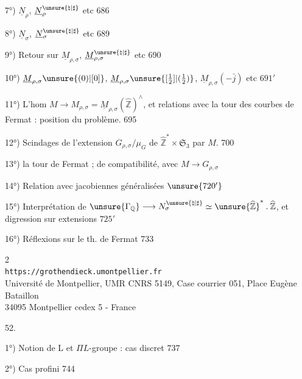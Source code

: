 7°) $\underline N_\rho$, $\underline N_\rho^{\unsure{\natural|\sharp}}$ etc \hfill 686

8°) $\underline N_\sigma$, $\underline N_\sigma^{\unsure{\natural|\sharp}}$ etc \hfill 689

9°) Retour sur $\underline M_{\rho,\sigma}$, $\underline M_{\rho,\sigma}^{\unsure{\natural|\sharp}}$ etc \hfill 690

10°) $\underline M_{\rho,\sigma}\unsure{(0)|[0]}$, $\underline M_{\rho,\sigma}\unsure{[\tfrac12]|(\tfrac12)}$, $\underline M_{\rho,\sigma}(-\bar j)$ etc \hfill $691'$

11°) L'hom $M\longrightarrow M_{\rho,\sigma}=\underline M_{\rho,\sigma}(\widehat{\mathbb Z})^{\wedge}$, et relations avec la tour des courbes de Fermat : position du problème. \hfill 695

12°) Scindages de l'extension $G_{\rho,\sigma}/\mu_G$ de $\widehat{\mathbb Z}^{*}\times\mathfrak S_3$ par $\widehat M$. \hfill 700

13°)  la tour de Fermat ;   de compatibilité, avec $M\longrightarrow G_{\rho,\sigma}$ \hfill {}

14°) Relation avec jacobiennes généralisées \hfill $\unsure{720'}$

15°) Interprétation de $\unsure{\Gamma_{\mathbb Q}}\longrightarrow N_\sigma^{\unsure{\natural|\sharp}}\simeq\unsure{\widehat{\mathbb Z}}^{*}\mathbin{.}\widehat{\mathbb Z}$, et digression sur extensions  \hfill $725'$

16°) Réflexions sur le th. de Fermat \hfill 733


\begin{center}
\small
2\\
\texttt{https://grothendieck.umontpellier.fr}\\
Université de Montpellier, UMR CNRS 5149, Case courrier 051, Place Eugène Bataillon\\
34095 Montpellier cedex 5 - France
\end{center}
52. 

1°) Notion de L et $\Pi L$-groupe : cas discret \hfill 737

2°) Cas profini \hfill 744

